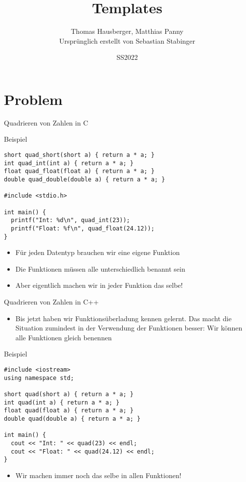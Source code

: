 \documentclass[presentation]{beamer}
\author{Thomas Hausberger, Matthias Panny \\ Ursprünglich erstellt von Sebastian Stabinger}
\date{SS2022}
\title{Templates}
\begin{document}
\maketitle

\section{Problem}
\label{sec:orgf3fb823}
\begin{frame}[label={sec:org0843f1f},fragile]{Quadrieren von Zahlen in C}
 \begin{exampleblock}{Beispiel}
\begin{verbatim}
short quad_short(short a) { return a * a; }
int quad_int(int a) { return a * a; }
float quad_float(float a) { return a * a; }
double quad_double(double a) { return a * a; }

#include <stdio.h>

int main() {
  printf("Int: %d\n", quad_int(23));
  printf("Float: %f\n", quad_float(24.12));
}
\end{verbatim}
\end{exampleblock}
\begin{itemize}
\item Für jeden Datentyp brauchen wir eine eigene Funktion
\item Die Funktionen müssen alle unterschiedlich benannt sein
\item Aber eigentlich machen wir \alert{in jeder Funktion das selbe}!
\end{itemize}
\end{frame}
\begin{frame}[label={sec:org1c1d5cc},fragile]{Quadrieren von Zahlen in C++}
 \begin{itemize}
\item Bis jetzt haben wir \alert{Funktionsüberladung} kennen gelernt. Das macht
die Situation zumindest in der Verwendung der Funktionen besser: Wir
können \alert{alle Funktionen gleich benennen}
\end{itemize}
\begin{exampleblock}{Beispiel}
\begin{verbatim}
#include <iostream>
using namespace std;

short quad(short a) { return a * a; }
int quad(int a) { return a * a; }
float quad(float a) { return a * a; }
double quad(double a) { return a * a; }

int main() {
  cout << "Int: " << quad(23) << endl;
  cout << "Float: " << quad(24.12) << endl;
}
\end{verbatim}
\end{exampleblock}
\begin{itemize}
\item Wir machen \alert{immer noch das selbe} in allen Funktionen!
\end{itemize}
\end{frame}
\end{document}
